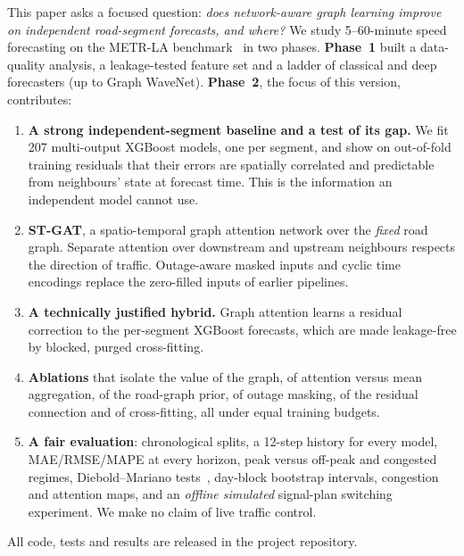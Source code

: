 This paper asks a focused question: \emph{does network-aware graph learning improve
on independent road-segment forecasts, and where?} We study 5--60-minute speed
forecasting on the METR-LA benchmark~\cite{li2018dcrnn} in two phases.
\textbf{Phase~1} built a data-quality analysis, a leakage-tested feature set and a
ladder of classical and deep forecasters (up to Graph WaveNet).
\textbf{Phase~2}, the focus of this version, contributes:
\begin{enumerate}
\item \textbf{A strong independent-segment baseline and a test of its gap.} We fit
207 multi-output XGBoost models, one per segment, and show on out-of-fold training
residuals that their errors are spatially correlated and predictable from
neighbours' state at forecast time. This is the information an independent model
cannot use.
\item \textbf{ST-GAT}, a spatio-temporal graph attention network over the
\emph{fixed} road graph. Separate attention over downstream and upstream neighbours
respects the direction of traffic. Outage-aware masked inputs and cyclic time
encodings replace the zero-filled inputs of earlier pipelines.
\item \textbf{A technically justified hybrid.} Graph attention learns a residual
correction to the per-segment XGBoost forecasts, which are made leakage-free by
blocked, purged cross-fitting.
\item \textbf{Ablations} that isolate the value of the graph, of attention versus
mean aggregation, of the road-graph prior, of outage masking, of the residual
connection and of cross-fitting, all under equal training budgets.
\item \textbf{A fair evaluation}: chronological splits, a 12-step history for every
model, MAE/RMSE/MAPE at every horizon, peak versus off-peak and congested
regimes, Diebold--Mariano tests~\cite{diebold1995}, day-block bootstrap
intervals, congestion and attention maps, and an \emph{offline simulated}
signal-plan switching experiment. We make no claim of live traffic control.
\end{enumerate}
All code, tests and results are released in the project repository.
